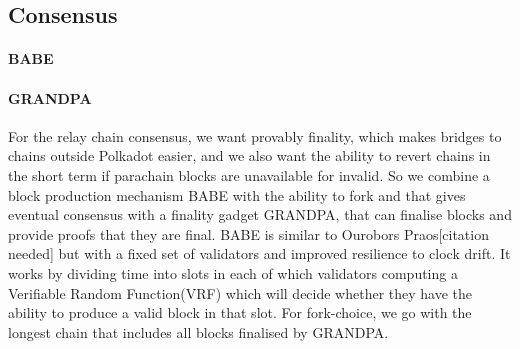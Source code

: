 \subsection{Consensus}
\paragraph{BABE}

\paragraph{GRANDPA}
For the relay chain consensus, we want provably finality, which makes bridges to chains outside Polkadot easier, and we also want the ability to revert chains in the short term if parachain blocks are unavailable for invalid.
So we combine a block production mechanism BABE with the ability to fork and that gives eventual consensus with a finality gadget GRANDPA, that can finalise blocks and provide proofs that they are final.
BABE is similar to Ourobors Praos[citation needed] but with a fixed set of validators and improved resilience to clock drift.
It works by dividing time into slots in each of which validators computing a Verifiable Random Function(VRF) which will decide whether they have the ability to produce a valid block in that slot.
For fork-choice, we go with the longest chain that includes all blocks finalised by GRANDPA.
